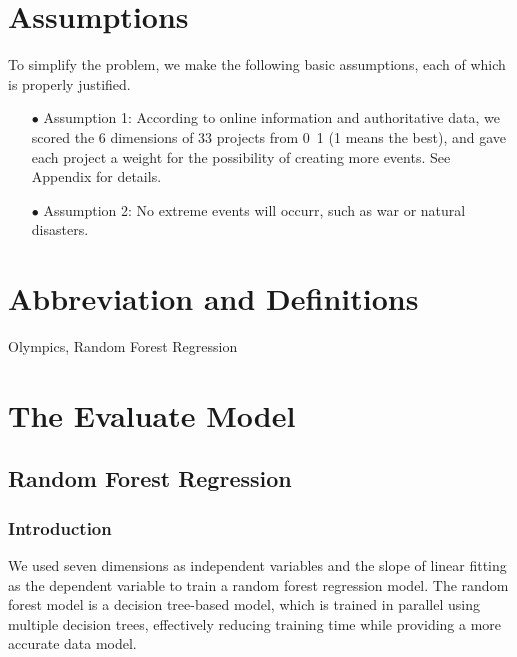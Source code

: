\documentclass[a4paper]{article}
\begin{document}
\section{Assumptions}
To simplify the problem, we make the following basic assumptions, each of which is
properly justified.
\begin{itemize}
\item[$\bullet$]Assumption 1: According to online information and authoritative data, 
we scored the 6 dimensions of 33 projects from 0~1 (1 means the best), and gave each project a weight for the possibility of creating more events. See Appendix for details.
\item[$\bullet$]Assumption 2:  No extreme events will occurr, such as war or natural disasters.
\end{itemize}
\section{Abbreviation and Definitions}
Olympics, Random Forest Regression
\section{The Evaluate Model}

\subsection{Random Forest Regression}
\subsubsection{Introduction}
We used seven dimensions as independent variables and the slope of linear fitting as the dependent variable to train a random forest regression model. The random forest model is a decision tree-based model, which is trained in parallel using multiple decision trees, effectively reducing training time while providing a more accurate data model.
\end{document}
